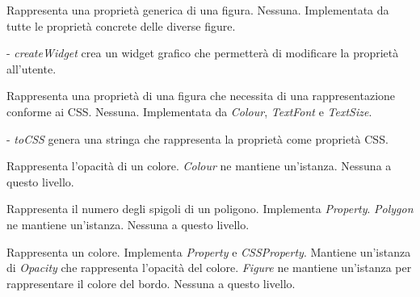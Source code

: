 Rappresenta una propriet\`a generica di una figura.
Nessuna.
Implementata da tutte le propriet\`a concrete delle diverse figure.
\begin{elencopuntato}[\normindent]
\item[-] \textit{createWidget} crea un widget grafico che permetter\`a di modificare la propriet\`a all'utente.
\end{elencopuntato}

Rappresenta una propriet\`a di una figura che necessita di una rappresentazione conforme ai CSS.
Nessuna.
Implementata da \textit{Colour}, \textit{TextFont} e \textit{TextSize}. 
\begin{elencopuntato}[\normindent]
\item[-] \textit{toCSS} genera una stringa che rappresenta la propriet\`a come propriet\`a CSS.
\end{elencopuntato}

Rappresenta l'opacit\`a di un colore.
\textit{Colour} ne mantiene un'istanza.
Nessuna a questo livello.

Rappresenta il numero degli spigoli di un poligono.
Implementa \textit{Property}.
\textit{Polygon} ne mantiene un'istanza.
Nessuna a questo livello.

Rappresenta un colore.
Implementa \textit{Property} e \textit{CSSProperty}. Mantiene un'istanza di \textit{Opacity} che rappresenta l'opacit\`a del colore.
\textit{Figure} ne mantiene un'istanza per rappresentare il colore del bordo.
Nessuna a questo livello.

